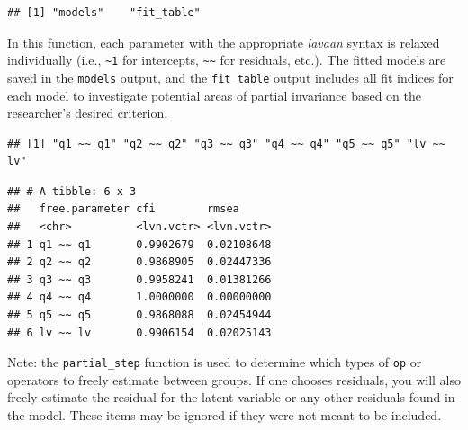 \documentclass[
  man]{apa7}
\newenvironment{Shaded}{\begin{snugshade}}{\end{snugshade}}
\newcommand{\FunctionTok}[1]{\textcolor[rgb]{0.13,0.29,0.53}{\textbf{#1}}}
\newcommand{\NormalTok}[1]{#1}
\newcommand{\SpecialCharTok}[1]{\textcolor[rgb]{0.81,0.36,0.00}{\textbf{#1}}}
\begin{document}
\normalsize

\begin{verbatim}
## [1] "models"    "fit_table"
\end{verbatim}

In this function, each parameter with the appropriate \emph{lavaan} syntax is relaxed individually (i.e., \texttt{\textasciitilde{}1} for intercepts, \texttt{\textasciitilde{}\textasciitilde{}} for residuals, etc.). The fitted models are saved in the \texttt{models} output, and the \texttt{fit\_table} output includes all fit indices for each model to investigate potential areas of partial invariance based on the researcher's desired criterion.

\small

\begin{Shaded}
\end{Shaded}

\normalsize

\begin{verbatim}
## [1] "q1 ~~ q1" "q2 ~~ q2" "q3 ~~ q3" "q4 ~~ q4" "q5 ~~ q5" "lv ~~ lv"
\end{verbatim}

\small

\begin{Shaded}
\end{Shaded}

\normalsize

\begin{verbatim}
## # A tibble: 6 x 3
##   free.parameter cfi        rmsea     
##   <chr>          <lvn.vctr> <lvn.vctr>
## 1 q1 ~~ q1       0.9902679  0.02108648
## 2 q2 ~~ q2       0.9868905  0.02447336
## 3 q3 ~~ q3       0.9958241  0.01381266
## 4 q4 ~~ q4       1.0000000  0.00000000
## 5 q5 ~~ q5       0.9868088  0.02454944
## 6 lv ~~ lv       0.9906154  0.02025143
\end{verbatim}

Note: the \texttt{partial\_step} function is used to determine which types of \texttt{op} or operators to freely estimate between groups. If one chooses residuals, you will also freely estimate the residual for the latent variable or any other residuals found in the model. These items may be ignored if they were not meant to be included.
\end{document}
